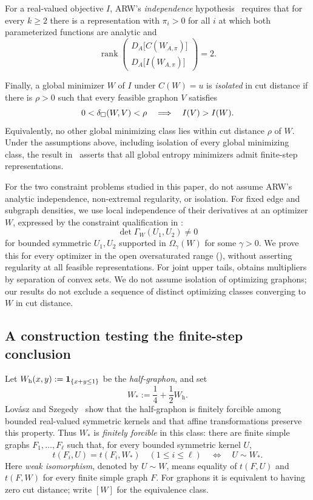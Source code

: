 For a real-valued objective $I$, ARW's \emph{independence}
hypothesis~\cite[Definition~5.4 and Theorem~5.25]{AlvaradoRamonWang2026}
requires that for every $k\ge2$ there is a representation with $\pi_i>0$
for all $i$ at which both parameterized functions are analytic and
\[
  \operatorname{rank}
  \begin{pmatrix}
    D_A\bigl[C(W_{A,\pi})\bigr]\\
    D_A\bigl[I(W_{A,\pi})\bigr]
  \end{pmatrix}=2.
\]

Finally, a global minimizer $W$ of $I$ under $C(W)=u$ is \emph{isolated}
in cut distance if there is $\rho>0$ such that every feasible graphon $V$ satisfies
\[
  0<\delta_\square(W,V)<\rho\quad\Longrightarrow\quad I(V)>I(W).
\]
Equivalently, no other global minimizing class lies within cut distance
$\rho$ of $W$.
Under the assumptions above, including isolation of every global minimizing
class, the result in~\cite[Theorem~5.25]{AlvaradoRamonWang2026} asserts that
all global entropy minimizers admit finite-step representations.

For the two constraint problems studied in this paper,
 do not assume ARW's analytic
independence, non-extremal regularity, or isolation.
For fixed edge and subgraph densities, we use local independence of their
derivatives at an optimizer $W$, expressed by the constraint
qualification in :
\[
  \det\Gamma_W(U_1,U_2)\ne0
\]
for bounded symmetric $U_1,U_2$ supported in $\Omega_\gamma(W)$ for some
$\gamma>0$. We prove this for every optimizer in the open oversaturated
range (), without asserting regularity
at all feasible representations. For joint upper tails,
 obtains multipliers by separation of convex
sets. We do not assume isolation of optimizing graphons;
our results do not exclude a sequence of distinct optimizing classes
converging to $W$ in cut distance.

\subsection{A construction testing the finite-step conclusion}\label{app:arw-entropy-counterexample}

Let
$W_{\mathrm h}(x,y):=\mathbf 1_{\{x+y\le1\}}$ be the \emph{half-graphon}, and set
\[
  W_*:=\frac14+\frac12W_{\mathrm h}.
\]
Lov\'asz and Szegedy~\cite{LovaszSzegedy2011} show that the half-graphon is
finitely forcible among bounded real-valued symmetric kernels and that
affine transformations preserve this property. Thus $W_*$ is
\emph{finitely forcible} in this class:
there are finite simple graphs $F_1,\dots,F_\ell$ such that, for every
bounded symmetric kernel $U$,
\[
  t(F_i,U)=t(F_i,W_*)\quad(1\le i\le\ell)
  \quad\Longleftrightarrow\quad U\sim W_*.
\]
Here \emph{weak isomorphism}, denoted by $U\sim W$, means equality of
$t(F,U)$ and $t(F,W)$ for every finite simple graph $F$.
For graphons it is equivalent to having zero cut distance; write $[W]$ for
the equivalence class.

